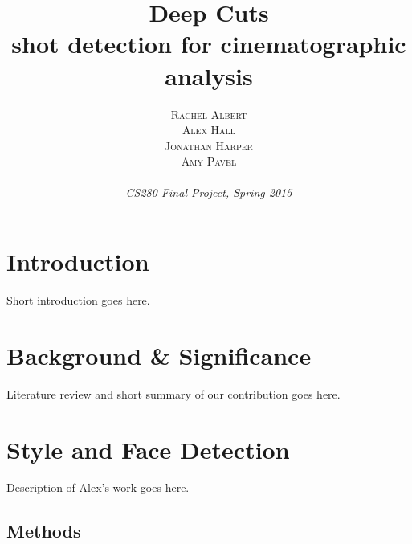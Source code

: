 \documentclass[a4paper, 11pt]{article} %
\title{\textbf{Deep Cuts}\\ %
\Large{shot detection for cinematographic analysis}} %
\author{\textsc{Rachel Albert\\ Alex Hall\\ Jonathan Harper\\ Amy Pavel} %
\\{\textit{\\CS280 Final Project, Spring 2015}}} %
\makeatletter
\renewcommand{\maketitle}{ %
\begin{centering} %
{\huge\@title} %

\vspace{50pt} %

{\large\@author} %

\vspace{40pt} %
\end{centering}
}
\makeatother
\begin{document}
\maketitle %



%
%


\section*{Introduction}

Short introduction goes here.


\section*{Background \& Significance}

Literature review and short summary of our contribution goes here.


\section*{Style and Face Detection}

Description of Alex's work goes here.


\subsection*{Methods}
\end{document}
